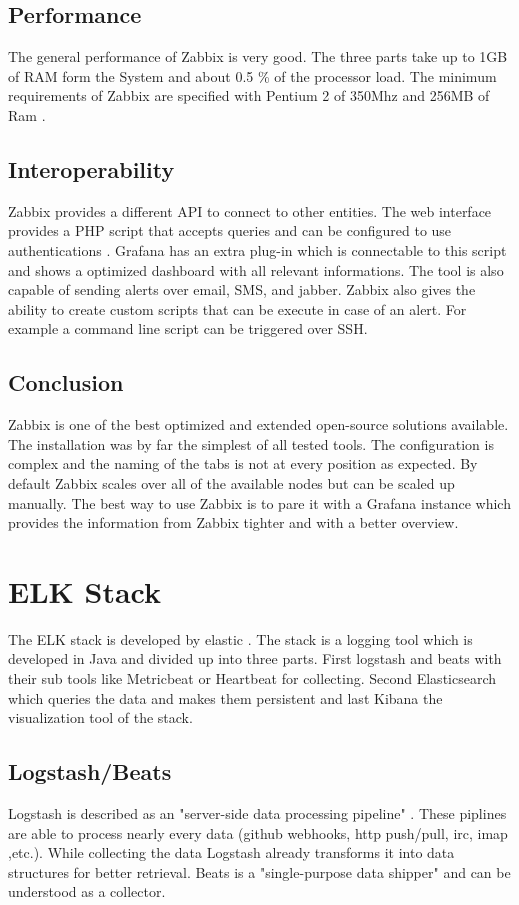 \subsection{Performance}
The general performance of Zabbix is very good. The three parts take up to 1GB of RAM form the System and about 0.5 \% of the processor load. The minimum requirements of Zabbix are specified with Pentium 2 of 350Mhz and 256MB of Ram \cite{Marik2014}.
\subsection{Interoperability}
Zabbix provides a different API to connect to other entities. The web interface  provides a PHP script that accepts queries and can be configured to use authentications . Grafana has an extra plug-in which is connectable to this script and shows a optimized dashboard with all relevant informations. The tool is also capable of sending alerts over email, SMS, and jabber. Zabbix also gives the ability to create custom scripts that  can be execute in case of an alert. For example a command line script can be triggered over SSH. 
\subsection{Conclusion}
Zabbix is one of the best optimized and extended open-source solutions available. The installation was by far the simplest of all tested tools. The configuration is complex and the naming of the tabs is not at every position as expected. By default Zabbix scales over all of the available nodes but can be scaled up manually. The best way to use Zabbix is to pare it with a Grafana instance which provides the information from Zabbix tighter and with a better overview.

\section{ELK Stack}
\label{elk} %
The ELK stack is developed by elastic \cite{elasticsearch}. 
The stack is a logging tool which is developed in Java and divided up into three parts. First  logstash and beats with their sub tools like Metricbeat or Heartbeat for collecting. Second Elasticsearch which queries the data and makes them persistent and last Kibana the visualization tool of the stack.
\subsection{Logstash/Beats}
Logstash is described as an 
"server-side data processing pipeline" \cite{elasticsearch}. These piplines are able to process nearly every data (github webhooks, http push/pull, irc, imap ,etc.).
While collecting the data Logstash already transforms it into data structures for better retrieval.
Beats is a "single-purpose data shipper" \cite{elasticsearch} and can be understood as a collector.
